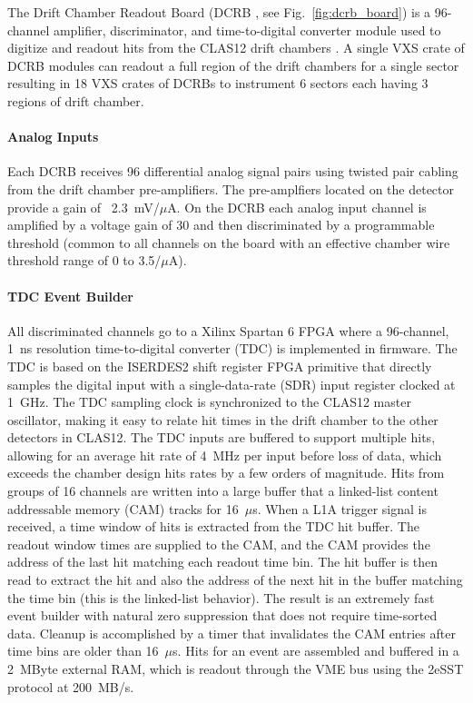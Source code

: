 The Drift Chamber Readout Board (DCRB \cite{dcrb-ref}, see Fig.~\ref{fig:dcrb_board}) is a 96-channel amplifier, discriminator, and time-to-digital converter module used to digitize and readout hits from the CLAS12 drift chambers \cite{dc-ref}. A single VXS crate of DCRB modules can readout a full region of the drift chambers for a single sector resulting in 18 VXS crates of DCRBs to instrument 6 sectors each having 3 regions of drift chamber.

\paragraph{Analog Inputs}
Each DCRB receives 96 differential analog signal pairs using twisted pair cabling from the drift chamber pre-amplifiers. The pre-amplfiers located on the detector provide a gain of ~2.3~mV/$\mu$A. On the DCRB each analog input channel is amplified by a voltage gain of 30 and then discriminated by a programmable threshold (common to all channels on the board with an effective chamber wire threshold range of 0 to 3.5/$\mu$A).

\paragraph{TDC Event Builder}
All discriminated channels go to a Xilinx Spartan 6 FPGA where a 96-channel, 1~ns resolution time-to-digital converter (TDC) is implemented in firmware. The TDC is based on the ISERDES2 shift register FPGA primitive that directly samples the digital input with a single-data-rate (SDR) input register clocked at 1~GHz. The TDC sampling clock is synchronized to the CLAS12 master oscillator, making it easy to relate hit times in the drift chamber to the other detectors in CLAS12. The TDC inputs are buffered to support multiple hits, allowing for an average hit rate of 4~MHz per input before loss of data, which exceeds the chamber design hits rates by a few orders of magnitude. Hits from groups of 16 channels are written into a large buffer that a linked-list content addressable memory (CAM) tracks for 16~$\mu$s. When a L1A trigger signal is received, a time window of hits is extracted from the TDC hit buffer. The readout window times are supplied to the CAM, and the CAM provides the address of the last hit matching each readout time bin. The hit buffer is then read to extract the hit and also the address of the next hit in the buffer matching the time bin (this is the linked-list behavior). The result is an extremely fast event builder with natural zero suppression that does not require time-sorted data. Cleanup is accomplished by a timer that invalidates the CAM entries after time bins are older than 16~$\mu$s. Hits for an event are assembled and buffered in a 2~MByte external RAM, which is readout through the VME bus using the 2eSST protocol at 200~MB/s.

